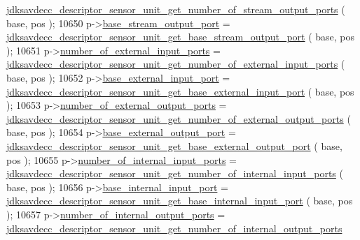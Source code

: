 \begin{DoxyCode}
      \hyperlink{group__descriptor__sensor_gab2a2415bdb011c81a9355ace29c95810}{jdksavdecc\_descriptor\_sensor\_unit\_get\_number\_of\_stream\_output\_ports}
      ( base, pos );
10650         p->\hyperlink{structjdksavdecc__descriptor__sensor__unit_a234b990d7bb2f22da0ba4bebadc71a70}{base\_stream\_output\_port} = 
      \hyperlink{group__descriptor__sensor_gaa3ef94c9e11759e6dabc6e0c38e5fc21}{jdksavdecc\_descriptor\_sensor\_unit\_get\_base\_stream\_output\_port}
      ( base, pos );
10651         p->\hyperlink{structjdksavdecc__descriptor__sensor__unit_a7e5320abe3b528f879c3314a19269335}{number\_of\_external\_input\_ports} = 
      \hyperlink{group__descriptor__sensor_gac77654ba9b70284408d511c712a9caa4}{jdksavdecc\_descriptor\_sensor\_unit\_get\_number\_of\_external\_input\_ports}
      ( base, pos );
10652         p->\hyperlink{structjdksavdecc__descriptor__sensor__unit_a292b30d547e9769f7ec471a9e26ae2c2}{base\_external\_input\_port} = 
      \hyperlink{group__descriptor__sensor_ga487635cae4012b028c998e9a8de883aa}{jdksavdecc\_descriptor\_sensor\_unit\_get\_base\_external\_input\_port}
      ( base, pos );
10653         p->\hyperlink{structjdksavdecc__descriptor__sensor__unit_ae7140af180c1c9cc1f5a6a414fe26ebb}{number\_of\_external\_output\_ports} = 
      \hyperlink{group__descriptor__sensor_ga72930266627c681c25b17f2749c8ed05}{jdksavdecc\_descriptor\_sensor\_unit\_get\_number\_of\_external\_output\_ports}
      ( base, pos );
10654         p->\hyperlink{structjdksavdecc__descriptor__sensor__unit_a3103a3898813f4104c1d1d7f984e8229}{base\_external\_output\_port} = 
      \hyperlink{group__descriptor__sensor_gab3845adedee2970fbdc68fabd0345b39}{jdksavdecc\_descriptor\_sensor\_unit\_get\_base\_external\_output\_port}
      ( base, pos );
10655         p->\hyperlink{structjdksavdecc__descriptor__sensor__unit_af14e1056175671f086901f07420bf46f}{number\_of\_internal\_input\_ports} = 
      \hyperlink{group__descriptor__sensor_ga78a8313d3d0cae46b393fb8c9141baa6}{jdksavdecc\_descriptor\_sensor\_unit\_get\_number\_of\_internal\_input\_ports}
      ( base, pos );
10656         p->\hyperlink{structjdksavdecc__descriptor__sensor__unit_a11d926248b31db1ff60e6416c9c3d996}{base\_internal\_input\_port} = 
      \hyperlink{group__descriptor__sensor_ga7087a03d95cefe2cd32db4457d0c5493}{jdksavdecc\_descriptor\_sensor\_unit\_get\_base\_internal\_input\_port}
      ( base, pos );
10657         p->\hyperlink{structjdksavdecc__descriptor__sensor__unit_aeba303ee329974d2a1c3ff9b5b41ed4b}{number\_of\_internal\_output\_ports} = 
      \hyperlink{group__descriptor__sensor_ga7894fb7137bf57538b73173d64b0f152}{jdksavdecc\_descriptor\_sensor\_unit\_get\_number\_of\_internal\_output\_ports}

\end{DoxyCode}
